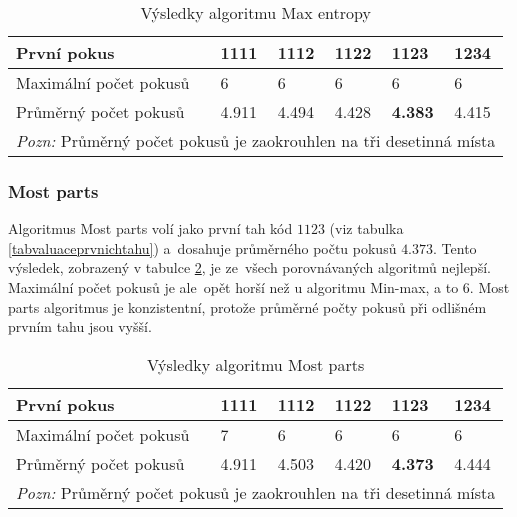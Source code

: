 \begin{table}[h]
\centering
\begin{tabular}{l l l l l l}
\toprule
První pokus & 1111 & 1112 & 1122 & 1123 & \textbf{1234} \\
\midrule

Maximální počet pokusů 
& 6 & 6 & 6 & 6 & 6 \\

Průměrný počet pokusů 
& 4.911 & 4.494 & 4.428 & \textbf{4.383} & 4.415 \\
\bottomrule
\multicolumn{6}{l}{\footnotesize \textit{Pozn:}
Průměrný počet pokusů je zaokrouhlen na tři desetinná místa}
\end{tabular}
\caption{Výsledky algoritmu Max entropy}\label{tabentropievysl}
\end{table}



\subsubsection{Most parts}
Algoritmus Most parts volí jako první tah kód $1123$ (viz tabulka \ref{tabvaluaceprvnichtahu}) a~dosahuje průměrného počtu pokusů $4.373$. Tento výsledek, zobrazený v tabulce \ref{tabcastivysl}, je ze~všech porovnávaných algoritmů nejlepší. Maximální počet pokusů je ale~opět horší než u algoritmu Min-max, a to 6. Most parts algoritmus je konzistentní, protože průměrné počty pokusů při odlišném prvním tahu jsou vyšší.


\begin{table}[h]
\centering
\begin{tabular}{l l l l l l}
\toprule
První pokus & 1111 & 1112 & 1122 & \textbf{1123} & 1234 \\
\midrule

Maximální počet pokusů 
& 7 & 6 & 6 & 6 & 6 \\

Průměrný počet pokusů 
& 4.911 & 4.503 & 4.420 & \textbf{4.373} & 4.444\\
\bottomrule
\multicolumn{6}{l}{\footnotesize \textit{Pozn:}
Průměrný počet pokusů je zaokrouhlen na tři desetinná místa}
\end{tabular}
\caption{Výsledky algoritmu Most parts}\label{tabcastivysl}
\end{table}


